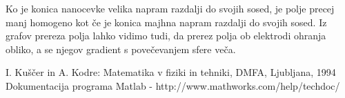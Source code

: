 \documentclass{article}[12pt]
\newtheorem{izrek}{Izrek}
\newenvironment{dokaz}%
{\noindent{\bf Dokaz.}\ }%
{\hfill$\Box$\par\bigskip}%
\begin{document}
Ko je konica nanocevke velika napram razdalji do svojih sosed, je polje precej manj homogeno kot če je konica majhna napram razdalji do svojih sosed.
Iz grafov prereza polja lahko vidimo tudi, da prerez polja ob elektrodi ohranja obliko, a se njegov gradient s povečevanjem sfere veča.


\begin{thebibliography}{99}

 I. Kuščer in A. Kodre: Matematika v fiziki in tehniki, DMFA, Ljubljana, 1994
 Dokumentacija programa Matlab - http://www.mathworks.com/help/techdoc/

\end{thebibliography}








\end{document}
